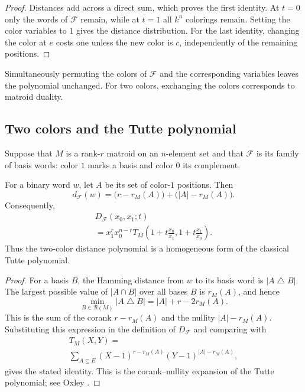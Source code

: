 \begin{proof}
Distances add across a direct sum, which proves the first identity. At $t=0$
only the words of $\mathcal F$ remain, while at $t=1$ all $k^n$ colorings
remain. Setting the color variables to $1$ gives the distance distribution.
For the last identity, changing the color at $e$ costs one unless the new
color is $c$, independently of the remaining positions.
\end{proof}

Simultaneously permuting the colors of $\mathcal F$ and the corresponding
variables leaves the polynomial unchanged. For two colors, exchanging the
colors corresponds to matroid duality.

\subsection[twoColors]{Two colors and the Tutte polynomial}

Suppose that $M$ is a rank-$r$ matroid on an $n$-element set and that
$\mathcal F$ is its family of basis words: color $1$ marks a basis and color
$0$ its complement.

\begin{proposition}
For a binary word $w$, let $A$ be its set of color-$1$ positions. Then
\[
 d_{\mathcal F}(w)
 =\bigl(r-r_M(A)\bigr)+\bigl(|A|-r_M(A)\bigr).
\]
Consequently,
\[
 \begin{gathered}
 D_{\mathcal F}(x_0,x_1;t)\\
 =x_1^r x_0^{n-r}
 T_M\left(1+t\frac{x_0}{x_1},
           1+t\frac{x_1}{x_0}\right).
 \end{gathered}
\]
Thus the two-color distance polynomial is a homogeneous form of the classical
Tutte polynomial.
\end{proposition}

\begin{proof}
For a basis $B$, the Hamming distance from $w$ to its basis word is
$|A\mathbin{\triangle}B|$. The largest possible value of $|A\cap B|$ over all
bases $B$ is $r_M(A)$, and hence
\[
 \min_{B\in\mathcal B(M)}|A\mathbin{\triangle}B|
 =|A|+r-2r_M(A).
\]
This is the sum of the corank $r-r_M(A)$ and the nullity
$|A|-r_M(A)$. Substituting this expression in the definition of
$D_{\mathcal F}$ and comparing with
\[
 \begin{gathered}
 T_M(X,Y)=\\
 \sum_{A\subseteq E}
  (X-1)^{r-r_M(A)}(Y-1)^{|A|-r_M(A)},
 \end{gathered}
\]
gives the stated identity. This is the corank--nullity expansion of the Tutte
polynomial; see Oxley \cite{Oxley2011}.
\end{proof}

